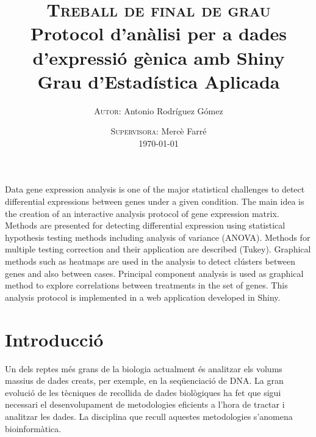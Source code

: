 \documentclass[english]{article}
\begin{document}
{\begin{list}{}{\leftmargin=3em\rightmargin=\leftmargin}
\small
 Data gene expression analysis is one of the major statistical challenges to detect differential expressions between genes under a given condition. The main idea is the creation of an interactive analysis protocol of gene expression matrix. Methods are presented for detecting differential expression using statistical hypothesis testing methods including analysis of variance (ANOVA). Methods for multiple testing correction and their application are described (Tukey). Graphical methods such as heatmaps are used in the analysis to detect clústers between genes and also between cases. Principal component analysis is used as graphical method to explore correlations between treatments in the set of genes. This analysis protocol is implemented in a web application developed in Shiny.
\end{list}\par\vspace{6mm}%
}

\title{
\textsc{Treball de final de grau}\\[2.6cm]
{\LARGE \bfseries Protocol d'anàlisi per a dades d'expressió gènica amb Shiny}\\{\Large\bfseries Grau d'Estadística Aplicada}\\[5cm]
}

\author{
\textsc{Autor:} Antonio Rodríguez Gómez
}

\date{
\textsc{Supervisora:} Mercè Farré \\[1em]
\today
}

\maketitle

\thispagestyle{empty}
\clearpage
\twocolumn[\makeAbstract]
\thispagestyle{empty}
\clearpage
\tableofcontents
\clearpage
\section{Introducció}
Un dels reptes més grans de la biologia actualment és analitzar els volums massius de dades creats, per exemple, en la seqüenciació de DNA. La gran evolució de les tècniques de recollida de dades biològiques ha fet que sigui necessari el desenvolupament de metodologies eficients a l'hora de tractar i analitzar les dades. La disciplina que recull aquestes metodologies s'anomena bioinformàtica.
\\
\end{document}
